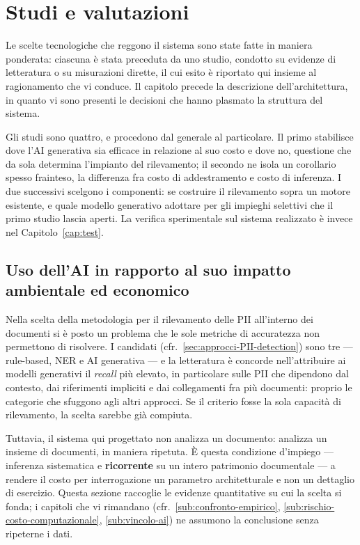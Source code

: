 \chapter{Studi e valutazioni}
\label{cap:studi}

Le scelte tecnologiche che reggono il sistema sono state fatte in maniera ponderata: ciascuna è stata preceduta da uno studio, condotto su evidenze di letteratura o su misurazioni dirette, il cui esito è riportato qui insieme al ragionamento che vi conduce. Il capitolo precede la descrizione dell'architettura, in quanto vi sono presenti le decisioni che hanno plasmato la struttura del sistema.

Gli studi sono quattro, e procedono dal generale al particolare. Il primo stabilisce dove l'AI generativa sia efficace in relazione al suo costo e dove no, questione che da sola determina l'impianto del rilevamento; il secondo ne isola un corollario spesso frainteso, la differenza fra costo di addestramento e costo di inferenza. I due successivi scelgono i componenti: se costruire il rilevamento sopra un motore esistente, e quale modello generativo adottare per gli impieghi selettivi che il primo studio lascia aperti. La verifica sperimentale sul sistema realizzato è invece nel Capitolo~\ref{cap:test}.

\section{Uso dell'AI in rapporto al suo impatto ambientale ed economico}
\label{sec:impatto-ambientale}
Nella scelta della metodologia per il rilevamento delle PII all'interno dei documenti si è posto un problema che le sole metriche di accuratezza non permettono di risolvere. I candidati (cfr.~\ref{sec:approcci-PII-detection}) sono tre --- rule-based, NER e AI generativa --- e la letteratura è concorde nell'attribuire ai modelli generativi il \textit{recall} più elevato, in particolare sulle PII che dipendono dal contesto, dai riferimenti impliciti e dai collegamenti fra più documenti: proprio le categorie che sfuggono agli altri approcci. Se il criterio fosse la sola capacità di rilevamento, la scelta sarebbe già compiuta. \medskip

Tuttavia, il sistema qui progettato non analizza un documento: analizza un insieme di documenti, in maniera ripetuta. È questa condizione d'impiego --- inferenza sistematica e \textbf{ricorrente} su un intero patrimonio documentale --- a rendere il costo per interrogazione un parametro architetturale e non un dettaglio di esercizio. Questa sezione raccoglie le evidenze quantitative su cui la scelta si fonda; i capitoli che vi rimandano (cfr.~\ref{sub:confronto-empirico}, \ref{sub:rischio-costo-computazionale}, \ref{sub:vincolo-ai}) ne assumono la conclusione senza ripeterne i dati.

